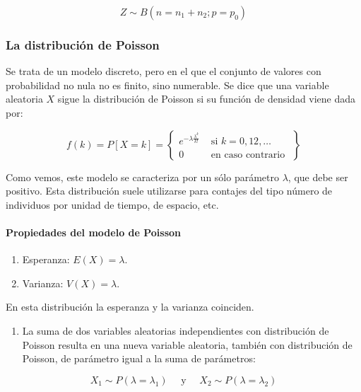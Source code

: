 \documentclass[
]{article}
\providecommand{\tightlist}{%
  \setlength{\itemsep}{0pt}\setlength{\parskip}{0pt}}
\begin{document}
\[
Z \sim B\left(n=n_{1}+n_{2} ; p=p_{0}\right)
\]

\subsubsection{La distribución de Poisson}\label{la-distribuciuxf3n-de-poisson}

Se trata de un modelo discreto, pero en el que el conjunto de valores con probabilidad no nula no es finito, sino numerable. Se dice que una variable aleatoria \(X\) sigue la distribución de Poisson si su función de densidad viene dada por:

\[
f(k)=P[X=k]=\left\{\begin{array}{ll}
e^{-\lambda \frac{\lambda^{k}}{k!}} & \text { si } k=0,12, \ldots \\
0 & \text { en caso contrario }
\end{array}\right\}
\]

Como vemos, este modelo se caracteriza por un sólo parámetro \(\lambda\), que debe ser positivo.
Esta distribución suele utilizarse para contajes del tipo número de individuos por unidad de tiempo, de espacio, etc.

\paragraph{Propiedades del modelo de Poisson}\label{propiedades-del-modelo-de-poisson}

\begin{enumerate}
\def\labelenumi{\arabic{enumi}.}
\tightlist
\item
  Esperanza: \(E(X)=\lambda\).
\item
  Varianza: \(V(X)=\lambda\).
\end{enumerate}

En esta distribución la esperanza y la varianza coinciden.

\begin{enumerate}
\def\labelenumi{\arabic{enumi}.}
\setcounter{enumi}{2}
\tightlist
\item
  La suma de dos variables aleatorias independientes con distribución de Poisson resulta en una nueva variable aleatoria, también con distribución de Poisson, de parámetro igual a la suma de parámetros:
\end{enumerate}

\[
X_{1} \sim P\left(\lambda=\lambda_{1}\right) \quad \text { y } \quad X_{2} \sim P\left(\lambda=\lambda_{2}\right)
\]
\end{document}
